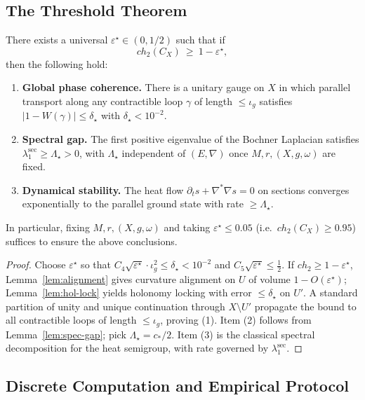 \subsection{The Threshold Theorem}

\begin{thm}\label{thm:threshold-rigorous}
There exists a universal $\varepsilon^\star\in(0,1/2)$ such that if
\[
ch_2(C_X)\ \ge\ 1-\varepsilon^\star,
\]
then the following hold:
\begin{enumerate}
\item \textbf{Global phase coherence.} There is a unitary gauge on $X$ in which parallel transport along any contractible loop $\gamma$ of length $\le \iota_g$ satisfies
$
|1-W(\gamma)|\le \delta_\star
$
with $\delta_\star<10^{-2}$.
\item \textbf{Spectral gap.} The first positive eigenvalue of the Bochner Laplacian satisfies
$
\lambda_1^\mathrm{sec}\ge \Lambda_\star>0
$,
with $\Lambda_\star$ independent of $(E,\nabla)$ once $M,r,(X,g,\omega)$ are fixed.
\item \textbf{Dynamical stability.} The heat flow $\partial_t s + \nabla^\ast\nabla s=0$ on sections converges exponentially to the parallel ground state with rate $\ge \Lambda_\star$.
\end{enumerate}
In particular, fixing $M,r,(X,g,\omega)$ and taking $\varepsilon^\star\le 0.05$ (i.e.\ $ch_2(C_X)\ge 0.95$) suffices to ensure the above conclusions.
\end{thm}

\begin{proof}
Choose $\varepsilon^\star$ so that $C_4\sqrt{\varepsilon^\star}\cdot \iota_g^2\le \delta_\star<10^{-2}$ and $C_5\sqrt{\varepsilon^\star}\le \tfrac{1}{2}$.
If $ch_2\ge 1-\varepsilon^\star$, Lemma~\ref{lem:alignment} gives curvature alignment on $U$ of volume $1-O(\varepsilon^\star)$; Lemma~\ref{lem:hol-lock} yields holonomy locking with error $\le \delta_\star$ on $U'$.
A standard partition of unity and unique continuation through $X\setminus U'$ propagate the bound to all contractible loops of length $\le \iota_g$, proving (1).
Item (2) follows from Lemma~\ref{lem:spec-gap}; pick $\Lambda_\star=c_\ast/2$.
Item (3) is the classical spectral decomposition for the heat semigroup, with rate governed by $\lambda_1^\mathrm{sec}$.
\end{proof}

\subsection{Discrete Computation and Empirical Protocol}

